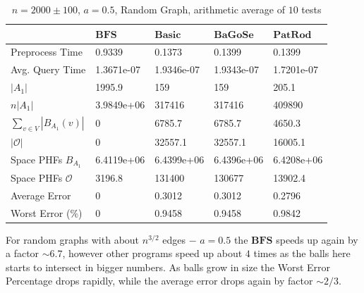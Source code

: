 \documentclass[shortabstract, lic, english]{iithesis}
\theoremstyle{definition} \newtheorem{definition}{Definition}[chapter]
\theoremstyle{plain} \newtheorem{remark}[definition]{Observation}
\theoremstyle{plain} \newtheorem{theorem}[definition]{Theorem}
\theoremstyle{plain} \newtheorem{lemma}[definition]{Lemma}
\theoremstyle{plain} \newtheorem{conjecture}[definition]{Conjecture}
\begin{document}
\begin{table}[H] \label{test:random.a0.5}
    \centering
    \begin{tabular}{ |p{3cm}||p{2cm}|p{2cm}|p{2cm}|p{2cm}|  } 
        \hline
        & $\mathbf{BFS}$ & $\mathbf{Basic}$ & $\mathbf{BaGoSe}$ & $\mathbf{PatRod}$ \\
        \hline
        \hline
        Preprocess Time                 & 0.9339     & 0.1373     & 0.1399      & 0.1399     \\
        \hline
        Avg. Query Time                 & 1.3671e-07 & 1.9346e-07 & 1.9343e-07  & 1.7201e-07 \\
        \hline
        $|A_1|$                         & 1995.9     & 159        & 159         & 205.1      \\
        \hline
        $n |A_1|$                       & 3.9849e+06 & 317416     & 317416      & 409890     \\
        \hline
        $\sum_{v \in V} |B_{A_1}(v)| $  & 0          & 6785.7     & 6785.7      & 4650.3     \\
        \hline
        $|\mathcal{O}|$                 & 0          & 32557.1    & 32557.1     & 16005.1    \\
        \hline
        Space PHFs $B_{A_1}$            & 6.4119e+06 & 6.4399e+06 & 6.4396e+06  & 6.4208e+06 \\
        \hline
        Space PHFs $\mathcal{O}$        & 3196.8     & 131400     & 130677      & 13902.4    \\
        \hline
        Average Error                   & 0          & 0.3012     & 0.3012      & 0.2796     \\
        \hline
        Worst Error (\%)                & 0          & 0.9458     & 0.9458      & 0.9842     \\
        \hline

    \end{tabular}
    \caption{$n = 2000 \pm 100$, $a = 0.5$, Random Graph, arithmetic average of $10$ tests}
\end{table}

For random graphs with about $n^{3/2}$ edges $-$ $a = 0.5$ the $\mathbf{BFS}$ speeds up again by a factor $\sim 6.7$, however other programs
speed up about $4$ times as the balls here starts to intersect in bigger numbers.
As balls grow in size the Worst Error Percentage drops rapidly, while the average error drops again by factor $\sim 2/3$.
\end{document}
